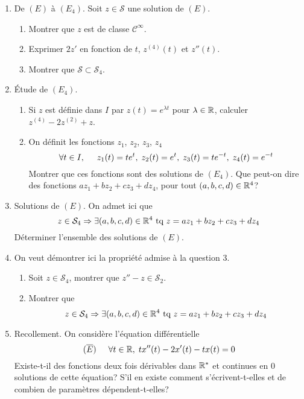 \begin{enumerate}
  \item De $(E)$ à $(E_4)$. Soit $z\in \mathcal{S}$ une solution de $(E)$. 
\begin{enumerate}
  \item Montrer que $z$ est de classe $\mathcal{C}^{\infty}$.
  \item Exprimer $2z'$ en fonction de $t$, $z^{(4)}(t)$ et $z''(t)$.
  \item Montrer que $\mathcal{S} \subset \mathcal{S}_4$.
\end{enumerate}

  \item \'Etude de $(E_4)$.
\begin{enumerate}
  \item Si $z$ est définie dans $I$ par $z(t)= e^{\lambda t}$ pour $\lambda \in \mathbb{R}$, calculer $z^{(4)} -2 z^{(2)} + z$.
  \item On définit les fonctions $z_1$, $z_2$, $z_3$, $z_4$
\begin{displaymath}
\forall t \in I, \hspace{0.5cm} z_1(t) = te^t,\;z_2(t) = e^t,\;z_3(t) = te^{-t},\;z_4(t) = e^{-t}  
\end{displaymath}
Montrer que ces fonctions sont des solutions de $(E_4)$. Que peut-on dire des fonctions $az_1 + bz_2 + cz_3 + dz_4$, pour tout $(a,b,c,d)\in \mathbb{R}^4$?
\end{enumerate}
\item Solutions de $(E)$. 
On admet ici que 
\begin{displaymath}
z \in \mathcal{S}_4  \Rightarrow \exists (a,b,c,d)\in \mathbb{R}^4 \text{ tq } z = az_1 + bz_2 + cz_3 + dz_4  
\end{displaymath}
Déterminer l'ensemble des solutions de $(E)$.

  \item On veut démontrer ici la propriété admise à la question 3.
\begin{enumerate}
  \item Soit $z\in \mathcal{S}_4$, montrer que $z'' -z \in \mathcal{S}_2$.
  \item Montrer que 
\begin{displaymath}
z \in \mathcal{S}_4  \Rightarrow \exists (a,b,c,d)\in \mathbb{R}^4 \text{ tq } z = az_1 + bz_2 + cz_3 + dz_4  
\end{displaymath}
\end{enumerate}
  \item Recollement. On considère l'équation différentielle
\begin{displaymath}
    (\overline{E})\hspace{0.5cm} \forall t \in \mathbb{R},\; tx''(t) - 2x'(t) -tx(t) = 0 \\
\end{displaymath}
Existe-t-il des fonctions deux fois dérivables dans $\mathbb{R}^*$ et continues en $0$ solutions de cette équation? S'il en existe comment s'écrivent-t-elles et de combien de paramètres dépendent-t-elles?
\end{enumerate}
